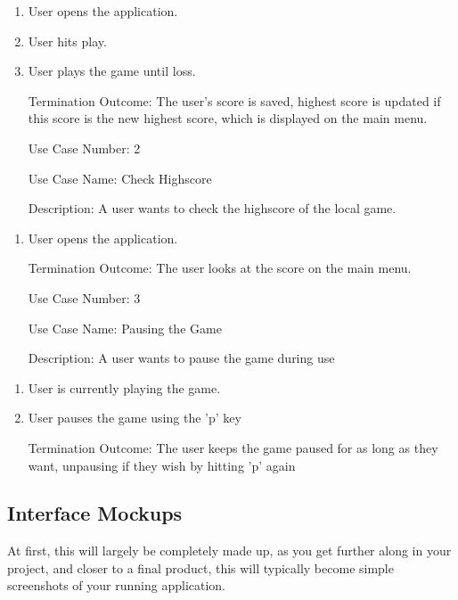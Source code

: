 \documentclass[10pt,conference,onecolumn,compsoc]{IEEEtran}
\begin{document}
\begin{enumerate}
\item User opens the application.
\item User hits play.
\item User plays the game until loss.
\item[Termination Outcome:] The user's score is saved, highest score is updated if this score is the new highest score, which is displayed on the main menu. 
\end{enumerate}

\begin{itemize}
\item[Use Case Number:] 2
\item[Use Case Name:] Check Highscore
\item[Description:] A user wants to check the highscore of the local game.
\end{itemize}

\begin{enumerate}
\item User opens the application.
\item[Termination Outcome:] The user looks at the score on the main menu.
\end{enumerate}


\begin{itemize}
\item[Use Case Number:] 3
\item[Use Case Name:] Pausing the Game
\item[Description:] A user wants to pause the game during use
\end{itemize}

\begin{enumerate}
\item User is currently playing the game.
\item User pauses the game using the 'p' key
\item[Termination Outcome:] The user keeps the game paused for as long as they want, unpausing if they wish by hitting 'p' again
\end{enumerate}


\subsection{Interface Mockups}
At first, this will largely be completely made up, as you get further along in your project, and closer to a final product, this will typically become simple screenshots of your running application.
\end{document}
